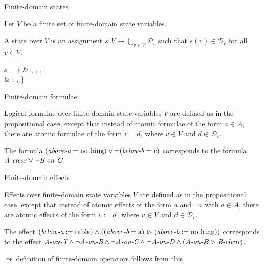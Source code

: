 \documentclass{gkibeamer}
\begin{document}
\begin{frame}{Finite-domain states}
  \begin{definition}
    Let $V$ be a finite set of finite-domain state variables.

    \smallskip
    
    A \alert{state} over $V$ is an assignment $s: V \rightarrow
    \bigcup_{v \in V} \mathcal D_v$ such that $s(v) \in \mathcal D_v$
    for all $v \in V$.
  \end{definition}

  \begin{example}
    \begin{tightalign}
      s = \{
        &
         \mapsto {},
         \mapsto {},
         \mapsto {}, \\
        &
         \mapsto {},
         \mapsto {},
         \mapsto {}
        \}
    \end{tightalign}
  \end{example}
\end{frame}

\begin{frame}{Finite-domain formulae}
  \begin{definition}
    \alert{Logical formulae over finite-domain state variables} $V$
    are defined as in the propositional case, except that
    instead of atomic formulae of the form $a \in A$,
    there are atomic formulae of the form $v = d$, where $v \in V$
    and $d \in \mathcal D_v$.
  \end{definition}

  \begin{example}
    The formula $(\textit{above-a} = \text{nothing}) \lor
    \neg (\textit{below-b} = \text{c})$ corresponds to the formula
    $\textit{A-clear} \lor \neg \textit{B-on-C}$.
  \end{example}
\end{frame}

\begin{frame}{Finite-domain effects}
  \begin{definition}
    \alert{Effects over finite-domain state variables} $V$ are defined
    as in the propositional case, except that instead of atomic
    effects of the form $a$ and $\neg a$ with $a \in A$, there are
    atomic effects of the form $v := d$, where $v \in V$ and $d \in
    \mathcal D_v$.
  \end{definition}

  \begin{example}
    The effect $(\textit{below-a} := \text{table}) \land
    ((\textit{above-b} = \text{a}) \vartriangleright
    (\textit{above-b} := \text{nothing}))$
    corresponds to the effect
    $\textit{A-on-T} \land \neg \textit{A-on-B} \land \neg \textit{A-on-C} \land \neg \textit{A-on-D}
    \land (\textit{A-on-B} \vartriangleright \textit{B-clear})$.
  \end{example}

  $\leadsto$ definition of \alert{finite-domain operators} follows
  from this
\end{frame}
\end{document}
